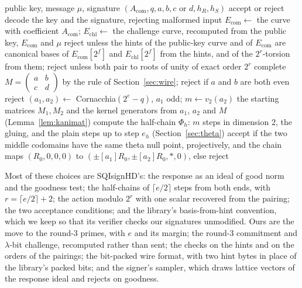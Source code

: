 \documentclass[version=preprint]{iacrcc}
\newcommand{\Ecom}{E_{\mathrm{com}}}
\newcommand{\Echl}{E_{\mathrm{chl}}}
\begin{document}
    \begin{algorithm}[t]
        \caption{Verification of a dimension-4 signature.}
        \label{alg:verify}
        \begin{algorithmic}[1]
            \Require public key, message $\mu$, signature $(A_{\mathrm{com}}, q, a,
            b, c \text{ or } d, h_R, h_S)$
            \Ensure accept or reject
            \State decode the key and the signature, rejecting malformed input
            \State $\Ecom \gets$ the curve with coefficient $A_{\mathrm{com}}$;
            $\Echl \gets$ the challenge curve, recomputed from the public key,
            $\Ecom$ and $\mu$
            \State reject unless the hints of the public-key curve and of $\Ecom$
            are canonical
            \State bases of $\Ecom[2^f]$ and $\Echl[2^f]$ from the hints, and of
            the $2^r$-torsion from them; reject unless both pair to roots of unity
            of exact order $2^r$
            \State complete $M = \left(\begin{smallmatrix} a & b \\ c & d
            \end{smallmatrix}\right)$ by the rule of Section~\ref{sec:wire};
            reject if $a$ and $b$ are both even
                \State reject
            \EndIf
            \State $(a_1, a_2) \gets$ Cornacchia$(2^e - q)$, $a_1$ odd; $m \gets
            v_2(a_2)$
            \State the starting matrices $M_1, M_2$ and the kernel generators
            from $a_1$, $a_2$ and $M$ (Lemma~\ref{lem:kanimat})
                \State compute the half-chain $\Phi_h$: $m$ steps in dimension 2,
                the gluing, and the plain steps up to step $e_h$
                (Section~\ref{sec:theta})
            \EndFor
            \State \Return accept if the two middle codomains have the same
            theta null point, projectively, and the chain maps $(R_0, 0, 0, 0)$ to
            $(\pm[a_1]R_0, \pm[a_2]R_0, \ast, 0)$, else reject
        \end{algorithmic}
    \end{algorithm}

    Most of these choices are SQIsignHD's: the response as an ideal of good
    norm and the goodness test; the half-chains of $\lceil e/2 \rceil$ steps
    from both ends, with $r = \lceil e/2 \rceil + 2$; the action modulo $2^r$
    with one scalar recovered from the pairing; the two acceptance conditions;
    and the library's basis-from-hint convention, which we keep so that its
    verifier checks our signatures unmodified. Ours are the move to the round-3
    primes, with $e$ and its margin; the round-3 commitment and $\lambda$-bit
    challenge, recomputed rather than sent; the checks on the hints and on the
    orders of the pairings; the bit-packed wire format, with two hint bytes in
    place of the library's packed bits; and the signer's sampler, which draws
    lattice vectors of the response ideal and rejects on goodness.
\end{document}
